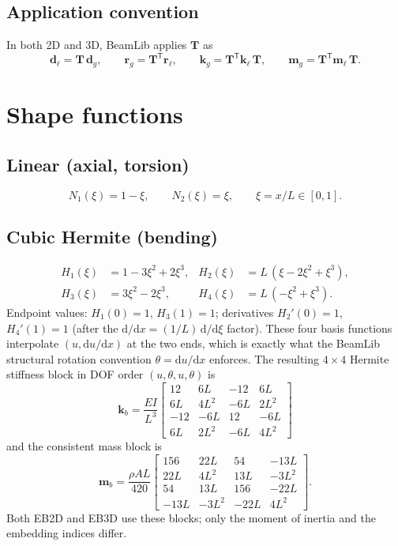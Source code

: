 \documentclass[11pt,a4paper]{book}
\newcommand{\dd}{\mathrm{d}}
\newcommand{\bmath}[1]{\boldsymbol{#1}}
\begin{document}
\subsection{Application convention}

In both 2D and 3D, BeamLib applies $\bmath{T}$ as
\[
\bmath{d}_\ell = \bmath{T}\,\bmath{d}_g, \qquad
\bmath{r}_g = \bmath{T}^\mathsf{T}\bmath{r}_\ell, \qquad
\bmath{k}_g = \bmath{T}^\mathsf{T}\bmath{k}_\ell\,\bmath{T}, \qquad
\bmath{m}_g = \bmath{T}^\mathsf{T}\bmath{m}_\ell\,\bmath{T}.
\]

\section{Shape functions}\label{sec:shape}

\subsection{Linear (axial, torsion)}
\[
N_1(\xi) = 1 - \xi, \qquad N_2(\xi) = \xi, \qquad \xi = x/L \in [0, 1].
\]

\subsection{Cubic Hermite (bending)}
\begin{align*}
H_1(\xi) &= 1 - 3\xi^2 + 2\xi^3, & H_2(\xi) &= L\,(\xi - 2\xi^2 + \xi^3), \\
H_3(\xi) &= 3\xi^2 - 2\xi^3,     & H_4(\xi) &= L\,(-\xi^2 + \xi^3).
\end{align*}
Endpoint values: $H_1(0)=1$, $H_3(1)=1$; derivatives $H_2'(0) = 1$, $H_4'(1) = 1$ (after the $\dd/\dd x = (1/L)\,\dd/\dd\xi$ factor). These four basis functions interpolate $(u, \dd u/\dd x)$ at the two ends, which is exactly what the BeamLib structural rotation convention $\theta = \dd u/\dd x$ enforces. The resulting $4\times 4$ Hermite stiffness block in DOF order $(u, \theta, u, \theta)$ is
\[
\bmath{k}_b = \frac{EI}{L^3}\begin{bmatrix}
12 & 6L & -12 & 6L \\
6L & 4L^2 & -6L & 2L^2 \\
-12 & -6L & 12 & -6L \\
6L & 2L^2 & -6L & 4L^2
\end{bmatrix}
\]
and the consistent mass block is
\[
\bmath{m}_b = \frac{\rho A L}{420}\begin{bmatrix}
156 & 22L & 54 & -13L \\
22L & 4L^2 & 13L & -3L^2 \\
54  & 13L & 156 & -22L \\
-13L & -3L^2 & -22L & 4L^2
\end{bmatrix}.
\]
Both EB2D and EB3D use these blocks; only the moment of inertia and the embedding indices differ.
\end{document}
